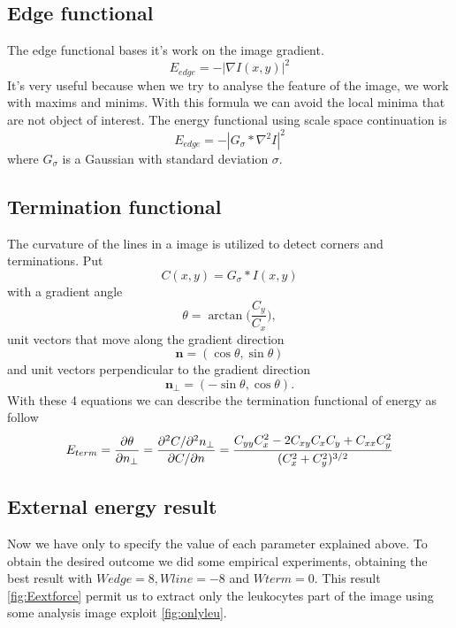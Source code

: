 \subsection{Edge functional}
The edge functional bases it's work on the image gradient.
\begin{equation}
E_{{edge}}=-\left|\nabla I(x,y)\right\vert ^{2}
\end{equation}
It's very useful because when we try to analyse the feature of the image, we work with maxims and minims. With this formula we can avoid the local minima that are not object of interest. The energy functional using scale space continuation is
\begin{equation}
E_{edge}=-\left|G_{\sigma }*\nabla ^{2}I\right\vert ^{2}
\end{equation}
where $ G_{\sigma } $ is a Gaussian with standard deviation $ \sigma $.

\subsection{Termination functional}
The curvature of the lines in a image is utilized to detect corners and terminations. Put 
\begin{equation}
C(x,y)=G_{{\sigma }}*I(x,y)
\end{equation}
with a gradient angle
\begin{equation}
\theta =\arctan {\Bigg (}{\frac  {C_{y}}{C_{x}}}{\Bigg )},
\end{equation}
unit vectors that move along the gradient direction 
\begin{equation}
{\mathbf  n}=(\cos \theta ,\sin \theta )
\end{equation}
and unit vectors perpendicular to the gradient direction
\begin{equation}
{\mathbf  n}_{{\perp }}=(-\sin \theta ,\cos \theta ).
\end{equation}
With these 4 equations we can describe the termination functional of energy as follow
\begin{equation}
E_{{term}}={\partial \theta  \over \partial n_{{\perp }}}={\partial ^{2}C/\partial ^{2}n_{{\perp }} \over \partial C/\partial n}={{C_{{yy}}C_{x}^{2}-2C_{{xy}}C_{x}C_{y}+C_{{xx}}C_{y}^{2}} \over (C_{x}^{2}+C_{y}^{2})^{{3/2}}}
\end{equation}

\subsection{External energy result}
Now we have only to specify the value of each parameter explained above.
To obtain the desired outcome we did some empirical experiments, obtaining the best result with $ Wedge=8, Wline=-8 $ and $ Wterm=0$. This result \ref{fig:Eextforce} permit us to extract only the leukocytes part of the image using some analysis image exploit \ref{fig:onlyleu}.

